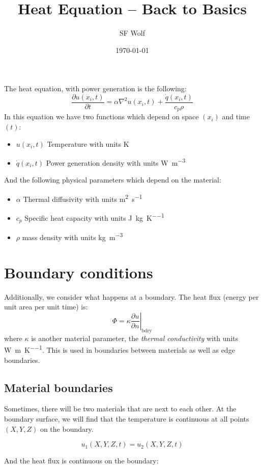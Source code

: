 \documentclass{article}
\title{Heat Equation -- Back to Basics}
\author{SF Wolf}
\date{\today}
\begin{document}
\maketitle

The heat equation, with power generation is the following:
\[
  \frac{\partial u(x_i,t)}{\partial t} = \alpha \nabla^2 u(x_i,t) + \frac{\dot{q}(x_i,t)}{c_p
    \rho}
\]
In this equation we have two functions which depend on space \((x_i)\) and time \((t)\):
\begin{itemize}
  \item \(u(x_i,t)\) Temperature with units \unit{\kelvin}
  \item \(\dot{q}(x_i,t)\) Power generation density with units \unit{\watt\per\meter^3}
\end{itemize}
And the following physical parameters which depend on the material:
\begin{itemize}
  \item \(\alpha\) Thermal diffusivity with units \unit{\meter^2\per\second}
  \item \(c_p\) Specific heat capacity with units \unit{\joule\per\kilo\gram\per\kelvin}
  \item \(\rho\) mass density with units \unit{\kilo\gram\per\meter^3}
\end{itemize}

\section{Boundary conditions}

Additionally, we consider what happens at a boundary. The heat flux (energy per unit area per
unit time) is:
\[
  \Phi = \left. \kappa\frac{\partial u}{\partial n}\right|_{\text{bdry}}
\]
where \(\kappa\) is another material parameter, the \emph{thermal conductivity} with units
\unit{\watt\per\meter\per\kelvin}. This is used in boundaries between materials as well as edge
boundaries.


\subsection{Material boundaries}

Sometimes, there will be two materials that are next to each other. At the boundary surface, we
will find that the temperature is continuous at all points \((X,Y,Z)\) on the boundary.

\[
  u_1(X,Y,Z,t) = u_2(X,Y,Z,t)
\]

And the heat flux is continuous on the boundary:
\end{document}
